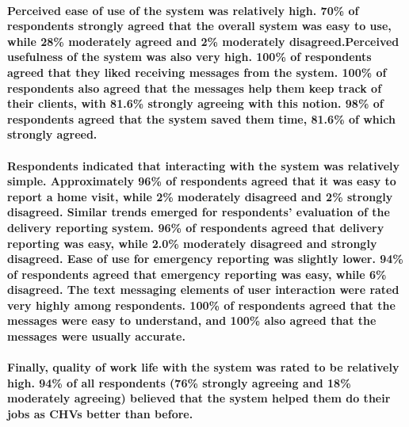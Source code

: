 \paragraph{Perceived ease of use of the system was relatively high. 70\% of respondents strongly agreed that the overall system was easy to use, while 28\% moderately agreed and 2\%  moderately disagreed.Perceived usefulness of the system was also very high. 100\% of respondents agreed that they liked receiving messages from the system. 100\% of respondents also agreed that the messages help them keep track of their clients, with 81.6\% strongly agreeing with this notion. 98\% of respondents agreed that the system saved them time, 81.6\% of which strongly agreed.}

\paragraph{Respondents indicated that interacting with the system was relatively simple.  Approximately 96\% of respondents agreed that it was easy to report a home visit, while 2\% moderately disagreed and 2\% strongly disagreed. Similar trends emerged for respondents' evaluation of the delivery reporting system. 96\% of respondents  agreed that delivery reporting was easy, while 2.0\% moderately disagreed and strongly disagreed. Ease of use for emergency reporting was slightly lower. 94\% of respondents agreed that emergency reporting was easy, while 6\% disagreed. The text messaging elements of user interaction were rated very highly among respondents. 100\% of respondents agreed that the messages were easy to understand, and 100\% also agreed that the messages were usually accurate.}

\paragraph{Finally, quality of work life with the system was rated to be relatively high. 94\% of all respondents (76\% strongly agreeing and 18\% moderately agreeing) believed that the system helped them do their jobs as CHVs better than before.}




